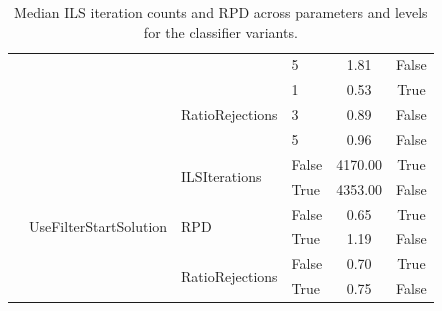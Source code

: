 \begin{table}[!ht]
\begin{tabular}{@{}l|l|l|l|c|c @{}}
		                                   &                                           &                                  & 5                    & 1.81            & False           \\\cline{3-6}
		                                   &                                           & \multirow{3}{*}{RatioRejections} & 1                    & 0.53            & True            \\\cline{4-6}
		                                   &                                           &                                  & 3                    & 0.89            & False           \\\cline{4-6}
		                                   &                                           &                                  & 5                    & 0.96            & False           \\\cline{2-6}
		                                   & \multirow{6}{*}{UseFilterStartSolution}   & \multirow{2}{*}{ILSIterations}   & False                & 4170.00         & True            \\\cline{4-6}
		                                   &                                           &                                  & True                 & 4353.00         & False           \\\cline{3-6}
		                                   &                                           & \multirow{2}{*}{RPD}             & False                & 0.65            & True            \\\cline{4-6}
		                                   &                                           &                                  & True                 & 1.19            & False           \\\cline{3-6}
		                                   &                                           & \multirow{2}{*}{RatioRejections} & False                & 0.70            & True            \\\cline{4-6}
		                                   &                                           &                                  & True                 & 0.75            & False           \\
	\end{tabular}

	\caption{Median ILS iteration counts and RPD across parameters and levels for the classifier variants.}
	\label{tab:numerical_results_paramStudy_classifiers}
\end{table}

